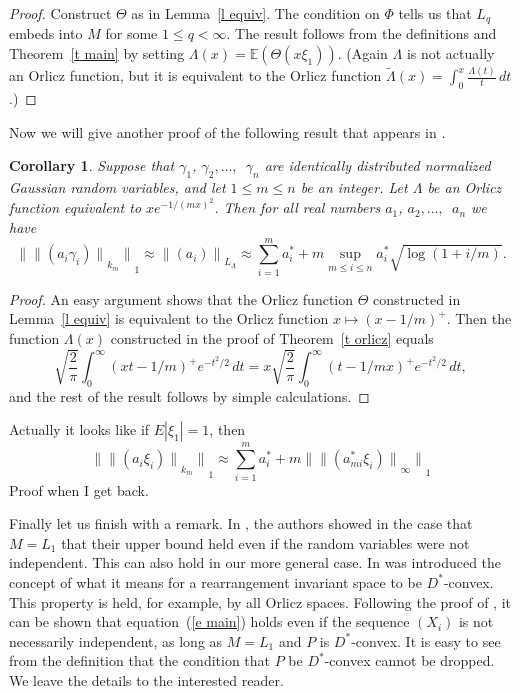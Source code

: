 \documentclass[12pt]{amsart}
\newtheorem{cor}[thm]{Corollary}
\newcommand{\E}{{\mathbb E}}
\newcommand{\snormo}[1]{{\mathopen\|#1\mathclose\|}}
\begin{document}
\begin{proof}
Construct $\Theta$ as in Lemma~\ref{l equiv}.  
The condition on $\Phi$ tells us that $L_q$ embeds into $M$ for some
$1 \le q < \infty$.
The result follows
from the definitions and Theorem~\ref{t main} by setting
$\Lambda(x) = \E(\Theta(x \xi_1))$.  (Again $\Lambda$ is not
actually an Orlicz function, but it is equivalent to the Orlicz
function $\tilde \Lambda(x) = \int_0^x \frac{\Lambda(t)}t \, dt$.)
\end{proof}

Now we will give another proof of the following result that appears in 
\cite{gordon et al}.

\begin{cor}
Suppose that $\gamma_1$, 
$\gamma_2,\dots,$\ $\gamma_n$ are identically distributed 
normalized Gaussian
random variables,
and let $1 \le m \le n$ be an integer.
Let $\Lambda$ be an Orlicz function equivalent to $x e^{-1/(mx)^2}$.
Then for all real numbers
$a_1$, $a_2,\dots,$\ $a_n$ we have
\[
   \snormo{\snormo{(a_i \gamma_i)}_{k_m}}_1 \approx \snormo{(a_i)}_{L_\Lambda} 
   \approx \sum_{i=1}^m a^*_i 
   + m \sup_{m \le i \le n} a^*_i \sqrt{\log(1+i/m)} .
\]
\end{cor}

\begin{proof}
An easy argument shows that the Orlicz function $\Theta$ constructed
in Lemma~\ref{l equiv} is equivalent to the 
Orlicz function $x \mapsto (x-1/m)^+$.  Then the function
$\Lambda(x)$ constructed in the proof of Theorem~\ref{t orlicz} equals
\[
\sqrt{\frac2\pi} \int_0^\infty (x t-1/m)^+ e^{-t^2/2} \, dt
=
x \sqrt{\frac2\pi} \int_0^\infty (t-1/mx)^+ e^{-t^2/2} \, dt ,
\]
and the rest of the result follows by simple calculations.
\end{proof}

Actually it looks like if $E|\xi_1| = 1$, then
\[
   \snormo{\snormo{(a_i \xi_i)}_{k_m}}_1 
   \approx \sum_{i=1}^m a^*_i  + 
    m \snormo{\snormo{(a^*_{m i} \xi_i)}_\infty}_1
\]
Proof when I get back.
\bigskip

Finally let us finish with a remark.  In \cite{gordon et al}, the authors
showed in the case that $M = L_1$
that their upper bound held even if the random variables were
not independent.  This can also hold in our more general case.
In \cite{montgomery-smith-semenov} was introduced the concept of what
it means for a rearrangement invariant space to be $D^*$-convex.
This property is held, for example, by all Orlicz spaces.
Following the proof of \cite[Theorem 27]{montgomery-smith-semenov},
it can be shown that equation~(\ref{e main}) holds even if the
sequence $(X_i)$ is not necessarily independent, as long as 
$M = L_1$ and $P$ is $D^*$-convex.  
It is easy to see from the definition that the condition that
$P$ be $D^*$-convex cannot be dropped.
We leave the details to the
interested reader.
\end{document}
